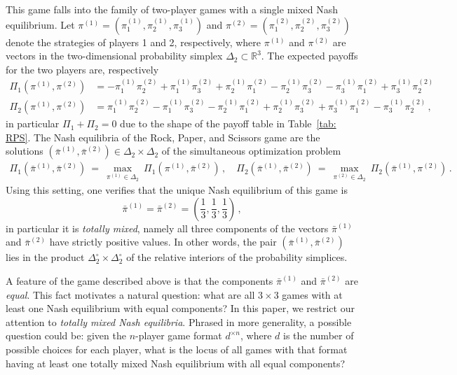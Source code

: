 \documentclass[12pt]{article}
\theoremstyle{definition}
\newcommand{\R}{{\mathbb R}}
\begin{document}
This game falls into the family of two-player games with a single mixed Nash equilibrium. Let $\pi^{(1)}=(\pi_1^{(1)},\pi_2^{(1)},\pi_3^{(1)})$ and $\pi^{(2)}=(\pi_1^{(2)},\pi_2^{(2)},\pi_3^{(2)})$ denote the strategies of players 1 and 2, respectively, where $\pi^{(1)}$ and $\pi^{(2)}$ are vectors in the two-dimensional probability simplex $\Delta_2\subset\R^3$. The expected payoffs for the two players are, respectively
\begin{align*}
    \Pi_1(\pi^{(1)},\pi^{(2)}) &= -\pi_1^{(1)}\pi_2^{(2)}+\pi_1^{(1)}\pi_3^{(2)}+\pi_2^{(1)}\pi_1^{(2)}-\pi_2^{(1)}\pi_3^{(2)}-\pi_3^{(1)}\pi_1^{(2)}+\pi_3^{(1)}\pi_2^{(2)}\\
    \Pi_2(\pi^{(1)},\pi^{(2)}) &= \pi_1^{(1)}\pi_2^{(2)}-\pi_1^{(1)}\pi_3^{(2)}-\pi_2^{(1)}\pi_1^{(2)}+\pi_2^{(1)}\pi_3^{(2)}+\pi_3^{(1)}\pi_1^{(2)}-\pi_3^{(1)}\pi_2^{(2)}\,,
\end{align*}
in particular $\Pi_1+\Pi_2=0$ due to the shape of the payoff table in Table~\ref{tab: RPS}. The Nash equilibria of the Rock, Paper, and Scissors game are the solutions $(\bar{\pi}^{(1)},\bar{\pi}^{(2)})\in\Delta_2\times\Delta_2$ of the simultaneous optimization problem
\begin{align*}
    \Pi_1\left(\bar{\pi}^{(1)},\bar{\pi}^{(2)}\right) \ =\  \max_{\pi^{(1)}\in\Delta_2}\ \Pi_1\left(\pi^{(1)},\bar{\pi}^{(2)}\right)\,,\quad
    \Pi_2\left(\bar{\pi}^{(1)},\bar{\pi}^{(2)}\right) \ =\  \max_{\pi^{(2)}\in\Delta_2}\ \Pi_2\left(\bar{\pi}^{(1)},\pi^{(2)}\right)\,.
\end{align*}
Using this setting, one verifies that the unique Nash equilibrium of this game is
\begin{equation}\label{eq: tmNE RPS}
    \bar{\pi}^{(1)} = \bar{\pi}^{(2)} = \left(\frac{1}{3},\frac{1}{3},\frac{1}{3}\right)\,,
\end{equation}
in particular it is {\em totally mixed}, namely all three components of the vectors $\bar{\pi}^{(1)}$ and $\bar{\pi}^{(2)}$ have strictly positive values. In other words, the pair $(\bar{\pi}^{(1)},\bar{\pi}^{(2)})$ lies in the product $\Delta_2^\circ\times\Delta_2^\circ$ of the relative interiors of the probability simplices.

\medskip

A feature of the game described above is that the components $\bar{\pi}^{(1)}$ and $\bar{\pi}^{(2)}$ are {\em equal}. This fact motivates a natural question: what are all $3\times 3$ games with at least one Nash equilibrium with equal components?
In this paper, we restrict our attention to {\em totally mixed Nash equilibria}. Phrased in more generality, a possible question could be: given the $n$-player game format $d^{\times n}$, where $d$ is the number of possible choices for each player, what is the locus of all games with that format having at least one totally mixed Nash equilibrium with all equal components?
\end{document}
